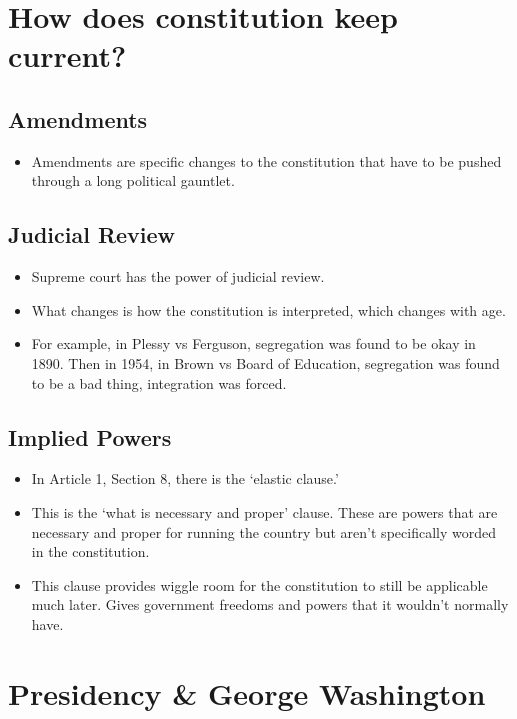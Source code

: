 \documentclass{article}
\begin{document}
\section{How does constitution keep current?}
  \subsection{Amendments}
    \begin{itemize}
      \item Amendments are specific changes to the constitution that have to be pushed through a long political gauntlet.
    \end{itemize}
  \subsection{Judicial Review}
    \begin{itemize}
      \item Supreme court has the power of judicial review.
      \item What changes is how the constitution is interpreted, which changes with age.
      \item For example, in Plessy vs Ferguson, segregation was found to be okay in 1890. Then in 1954, in Brown vs Board of Education, segregation was found to be a bad thing, integration was forced.
    \end{itemize}
  \subsection{Implied Powers}
    \begin{itemize}
      \item In Article 1, Section 8, there is the `elastic clause.'
      \item This is the `what is necessary and proper' clause. These are powers that are necessary and proper for running the country but aren't specifically worded in the constitution.
      \item This clause provides wiggle room for the constitution to still be applicable much later. Gives government freedoms and powers that it wouldn't normally have.
    \end{itemize}

\section{Presidency \& George Washington}
\end{document}
